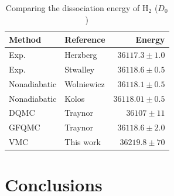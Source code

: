 \documentclass{article}
\begin{document}
\begin{table}
\caption{Comparing the dissociation energy of H$_2$ ($D_0$)}\label{D_e}
\centering
\begin{tabular}{llr}
\hline
Method      & Reference                                   & Energy      \\ \hline
Exp.        & Herzberg \citep{herzberg1970dissociation}   & $36 117.3 \pm 1.0$ \\
Exp.        & Stwalley \citep{stwalley1970dissociation}   & $36 118.6 \pm 0.5$  \\
Nonadiabatic& Wolniewicz \citep{wolniewicz1983x}          & $36 118.1 \pm 0.5$ \\
Nonadiabatic& Kolos \citep{szalewicz1986new}              & $36 118.01 \pm 0.5$ \\
DQMC        & Traynor \citep{traynor1991quantum}          & $36 107 \pm 11$ \\
GFQMC       & Traynor \citep{traynor1991quantum}          & $36 118.6 \pm 2.0$ \\
VMC         & This work                                   & $36 219.8 \pm 70$  \\ \hline
\end{tabular}
\end{table}









\section{Conclusions}
\end{document}
